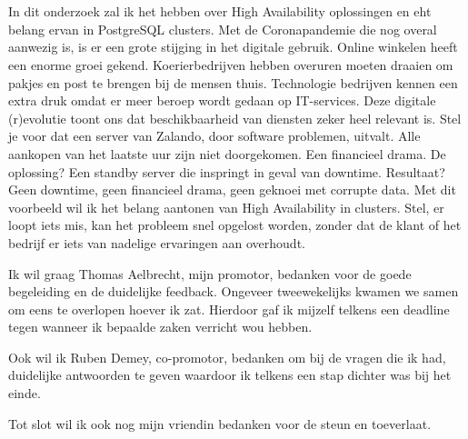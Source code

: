 
\chapter*{}
\label{ch:voorwoord}


In dit onderzoek zal ik het hebben over High Availability oplossingen en eht belang ervan in PostgreSQL clusters. Met de Coronapandemie die nog overal aanwezig is, is er een grote stijging in het digitale gebruik. Online winkelen heeft een enorme groei gekend. Koerierbedrijven hebben overuren moeten draaien om pakjes en post te brengen bij de mensen thuis. Technologie bedrijven kennen een extra druk omdat er meer beroep wordt gedaan op IT-services. Deze digitale (r)evolutie toont ons dat beschikbaarheid van diensten zeker heel relevant is. Stel je voor dat een server van Zalando, door software problemen, uitvalt. Alle aankopen van het laatste uur zijn niet doorgekomen. Een financieel drama. De oplossing? Een standby server die inspringt in geval van downtime. Resultaat? Geen downtime, geen financieel drama, geen geknoei met corrupte data. Met dit voorbeeld wil ik het belang aantonen van High Availability in clusters. Stel, er loopt iets mis, kan het probleem snel opgelost worden, zonder dat de klant of het bedrijf er iets van nadelige ervaringen aan overhoudt.

Ik wil graag Thomas Aelbrecht, mijn promotor, bedanken voor de goede begeleiding en de duidelijke feedback. Ongeveer tweewekelijks kwamen we samen om eens te overlopen hoever ik zat. Hierdoor gaf ik mijzelf telkens een deadline tegen wanneer ik bepaalde zaken verricht wou hebben.

Ook wil ik Ruben Demey, co-promotor, bedanken om bij de vragen die ik had, duidelijke antwoorden te geven waardoor ik telkens een stap dichter was bij het einde.

Tot slot wil ik ook nog mijn vriendin bedanken voor de steun en toeverlaat.